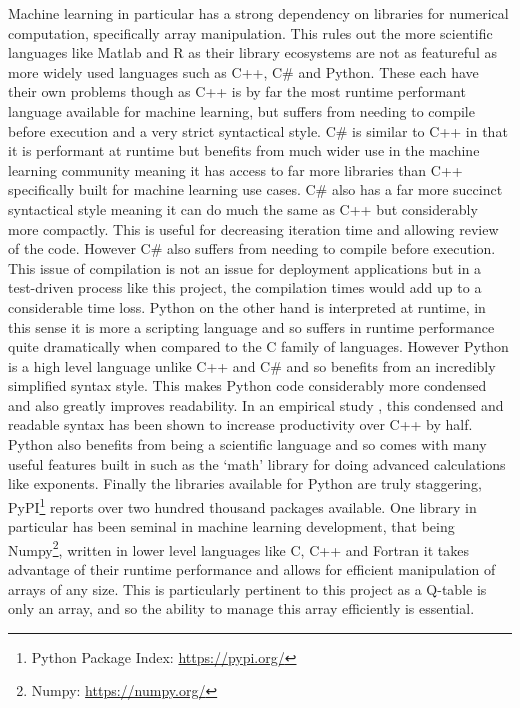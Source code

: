 \documentclass[hidelinks,journal]{IEEEtran}
\begin{document}
Machine learning in particular has a strong dependency on libraries for numerical computation, specifically array manipulation. This rules out the more scientific languages like Matlab and R as their library ecosystems are not as featureful as more widely used languages such as C++, C\# and Python. These each have their own problems though as C++ is by far the most runtime performant language available for machine learning, but suffers from needing to compile before execution and a very strict syntactical style. C\# is similar to C++ in that it is performant at runtime but benefits from much wider use in the machine learning community meaning it has access to far more libraries than C++ specifically built for machine learning use cases. C\# also has a far more succinct syntactical style meaning it can do much the same as C++ but considerably more compactly. This is useful for decreasing iteration time and allowing review of the code. However C\# also suffers from needing to compile before execution. This issue of compilation is not an issue for deployment applications but in a test-driven process like this project, the compilation times would add up to a considerable time loss. Python on the other hand is interpreted at runtime, in this sense it is more a scripting language and so suffers in runtime performance quite dramatically when compared to the C family of languages. However Python is a high level language unlike C++ and C\# and so benefits from an incredibly simplified syntax style. This makes Python code considerably more condensed and also greatly improves readability. In an empirical study \textcite{Prechelt00}, this condensed and readable syntax has been shown to increase productivity over C++ by half. Python also benefits from being a scientific language and so comes with many useful features built in such as the ‘math’ library for doing advanced calculations like exponents. Finally the libraries available for Python are truly staggering, PyPI\footnote{Python Package Index: \url{https://pypi.org/}} reports over two hundred thousand packages available. One library in particular has been seminal in machine learning development, that being Numpy\footnote{Numpy: \url{https://numpy.org/}}, written in lower level languages like C, C++ and Fortran it takes advantage of their runtime performance and allows for efficient manipulation of arrays of any size. This is particularly pertinent to this project as a Q-table is only an array, and so the ability to manage this array efficiently is essential.
\end{document}
